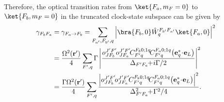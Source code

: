 \documentclass[]{report}
\begin{document}
Therefore, the optical transition rates from $ \ket{F_a,m_F=0} $ to $ \ket{F_b,m_F=0} $ in the truncated clock-state subspace can be given by
\begin{align}
\gamma_{F_bF_a} &=\gamma_{F_a\rightarrow F_b} = \sum_{F_{a'},F_{b'},q} \left| \bra{F_b,0} \hat{W}_q^{F_{b'}F_{a'}}\ket{F_a,0}\right|^2\\
&= \frac{\Omega^2(\mathbf{r}')}{4}\sum_{F',q} \Gamma\left|  \frac{o^{J'F'}_{JF_b}\! o^{J'F'}_{JF_a}\!  C^{F_b 0;1q}_{F' q}\! C^{F_a 0;1q}_{F' q}\! \left(\mathbf{e}^*_{q}\! \cdot\! \mathbf{e}_L \right)}{ \Delta_{F'F_a} \!\!+\! i\Gamma/2} \right|^2\\
&= \frac{\Gamma\Omega^2(\mathbf{r}')}{4}\sum_{F',q}   \frac{ \left|o^{J'F'}_{JF_b}\! o^{J'F'}_{JF_a}\!  C^{F_b 0;1q}_{F' q}\! C^{F_a 0;1q}_{F' q}\! \left(\mathbf{e}^*_{q}\! \cdot\! \mathbf{e}_L \right)\right|^2}{ \Delta_{F'F_a}^2 \!\!+\! \Gamma^2/4} .
\end{align} 
\end{document}
